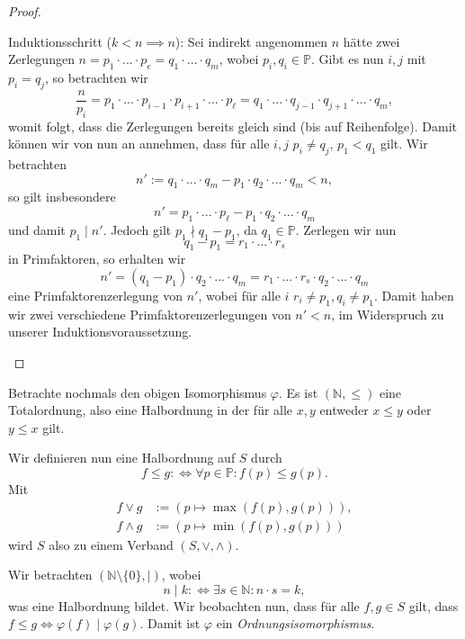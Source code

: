 \begin{proof}
\begin{itemize}[topsep=0cm, label={--}]
        Induktionsschritt ($k<n \implies n$): Sei indirekt angenommen $n$ hätte zwei Zerlegungen $n = p_1 \cdot ... \cdot p_e = q_1 \cdot ... \cdot q_m$, wobei $p_i, q_i \in \mathbb{P}$. Gibt es nun $i,j$ mit $p_i = q_j$, so betrachten wir
        $$ \frac{n}{p_i} = p_1 \cdot ... \cdot p_{i-1} \cdot p_{i+1} \cdot ... \cdot p_\ell = q_1 \cdot ... \cdot q_{j-1} \cdot q_{j+1} \cdot ... \cdot q_m, $$
        womit folgt, dass die Zerlegungen bereits gleich sind (bis auf Reihenfolge). Damit können wir von nun an annehmen, dass für alle $i, j$ $p_i \neq q_j$, \obda $p_1 < q_1$ gilt. Wir betrachten
        $$ n' := q_1 \cdot ... \cdot q_m - p_1 \cdot q_2 \cdot ... \cdot q_m < n, $$
        so gilt insbesondere
        $$ n' = p_1 \cdot ... \cdot p_\ell - p_1 \cdot q_2 \cdot ... \cdot q_m $$
        und damit $p_1 \mid n'$. Jedoch gilt $p_1 \nmid q_1 - p_1$, da $q_1 \in \mathbb{P}$. Zerlegen wir nun
        $$ q_1 - p_1 = r_1 \cdot ... \cdot r_s $$
        in Primfaktoren, so erhalten wir
        $$ n' = (q_1 - p_1) \cdot q_2 \cdot ... \cdot q_m = r_1 \cdot ... \cdot r_s \cdot q_2 \cdot ... \cdot q_m $$
        eine Primfaktorenzerlegung von $n'$, wobei für alle $i$ $r_i \neq p_1, q_i \neq p_1$. Damit haben wir zwei verschiedene Primfaktorenzerlegungen von $n' < n$, im Widerspruch zu unserer Induktionsvoraussetzung.
    \end{itemize}
\end{proof}

\begin{remark}
    Betrachte nochmals den obigen Isomorphismus $\varphi$. Es ist $(\mathbb{N}, \leq)$ eine Totalordnung, also eine Halbordnung in der für alle $x,y$ entweder $x \leq y$ oder $y \leq x$ gilt.

    Wir definieren nun eine Halbordnung auf $S$ durch
    $$ f \leq g :\Leftrightarrow \forall p \in \mathbb{P}: f(p) \leq g(p). $$
    Mit 
    \begin{align*}
        f \vee g &:= (p \mapsto \max(f(p),g(p))), \\ f \wedge g &:= (p \mapsto \min(f(p),g(p)))
    \end{align*}
    wird $S$ also zu einem Verband $(S, \vee, \wedge)$.
\end{remark}

\begin{remark}
    Wir betrachten $(\mathbb{N} \setminus \{ 0 \}, \mid)$, wobei
    $$ n \mid k :\Leftrightarrow \exists s \in \mathbb{N}: n \cdot s = k, $$
    was eine Halbordnung bildet. Wir beobachten nun, dass für alle $f,g \in S$ gilt, dass $f \leq g \Leftrightarrow \varphi(f) \mid \varphi(g)$. Damit ist $\varphi$ ein \emph{Ordnungsisomorphismus}.
\end{remark}

